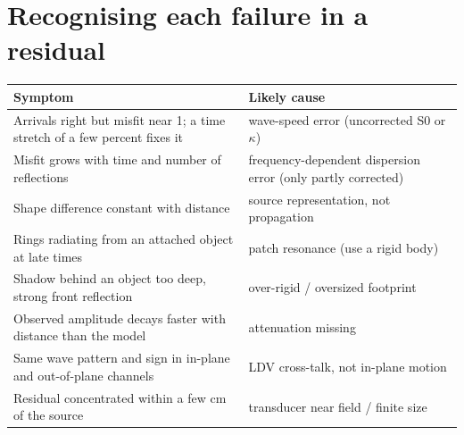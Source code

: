 \documentclass[11pt,a4paper]{article}
\begin{document}
\section{Recognising each failure in a residual}
\begin{table}[h]
\centering\small
\begin{tabularx}{\textwidth}{@{}LL@{}}
\toprule
Symptom & Likely cause \\
\midrule
Arrivals right but misfit near 1; a time stretch of a few percent fixes it & wave-speed error (uncorrected S0 or $\kappa$) \\
Misfit grows with time and number of reflections & frequency-dependent dispersion error (only partly corrected) \\
Shape difference constant with distance & source representation, not propagation \\
Rings radiating from an attached object at late times & patch resonance (use a rigid body) \\
Shadow behind an object too deep, strong front reflection & over-rigid / oversized footprint \\
Observed amplitude decays faster with distance than the model & attenuation missing \\
Same wave pattern and sign in in-plane and out-of-plane channels & LDV cross-talk, not in-plane motion \\
Residual concentrated within a few cm of the source & transducer near field / finite size \\
\bottomrule
\end{tabularx}
\end{table}
\end{document}
